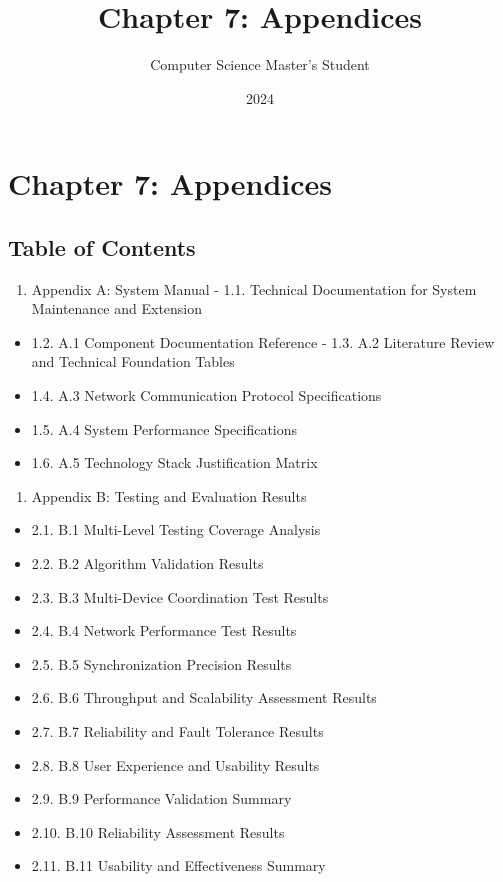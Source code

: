 \documentclass[11pt,a4paper]{article}
\title{Chapter 7: Appendices}
\author{Computer Science Master's Student}
\date{2024}
\begin{document}
\maketitle

\section{Chapter 7: Appendices}

\subsection{Table of Contents}

\begin{enumerate}
\item Appendix A: System Manual
    -
    1.1. Technical Documentation for System Maintenance and Extension
\end{enumerate}
\begin{itemize}
\item 1.2. A.1 Component Documentation Reference
    -
    1.3. A.2 Literature Review and Technical Foundation Tables
\item 1.4. A.3 Network Communication Protocol Specifications
\item 1.5. A.4 System Performance Specifications
\item 1.6. A.5 Technology Stack Justification Matrix
\end{itemize}
\begin{enumerate}
\item Appendix B: Testing and Evaluation Results
\end{enumerate}
\begin{itemize}
\item 2.1. B.1 Multi-Level Testing Coverage Analysis
\item 2.2. B.2 Algorithm Validation Results
\item 2.3. B.3 Multi-Device Coordination Test Results
\item 2.4. B.4 Network Performance Test Results
\item 2.5. B.5 Synchronization Precision Results
\item 2.6. B.6 Throughput and Scalability Assessment Results
\item 2.7. B.7 Reliability and Fault Tolerance Results
\item 2.8. B.8 User Experience and Usability Results
\item 2.9. B.9 Performance Validation Summary
\item 2.10. B.10 Reliability Assessment Results
\item 2.11. B.11 Usability and Effectiveness Summary
\end{itemize}
\end{document}
